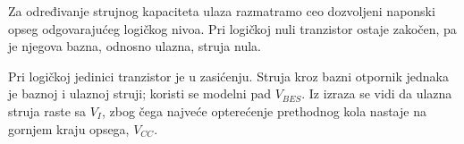 Za određivanje strujnog kapaciteta ulaza razmatramo ceo dozvoljeni naponski opseg odgovarajućeg logičkog nivoa. Pri logičkoj nuli tranzistor ostaje zakočen, pa je njegova bazna, odnosno ulazna, struja nula.

Pri logičkoj jedinici tranzistor je u zasićenju. Struja kroz bazni otpornik jednaka je baznoj i ulaznoj struji; koristi se modelni pad $V_{BES}$. Iz izraza se vidi da ulazna struja raste sa $V_I$, zbog čega najveće opterećenje prethodnog kola nastaje na gornjem kraju opsega, $V_{CC}$.
